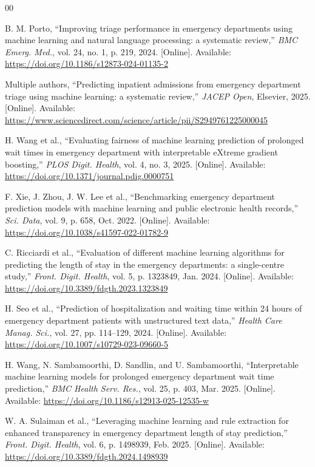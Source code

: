 \documentclass[conference]{IEEEtran}
\begin{document}
\begin{thebibliography}{00}

B. M. Porto, ``Improving triage performance in emergency departments using
machine learning and natural language processing: a systematic review,''
\textit{BMC Emerg. Med.}, vol. 24, no. 1, p. 219, 2024. [Online]. Available:
\url{https://doi.org/10.1186/s12873-024-01135-2}

Multiple authors, ``Predicting inpatient admissions from emergency department
triage using machine learning: a systematic review,'' \textit{JACEP Open},
Elsevier, 2025. [Online]. Available:
\url{https://www.sciencedirect.com/science/article/pii/S2949761225000045}

H. Wang et al., ``Evaluating fairness of machine learning prediction of
prolonged wait times in emergency department with interpretable eXtreme
gradient boosting,'' \textit{PLOS Digit. Health}, vol. 4, no. 3, 2025.
[Online]. Available: \url{https://doi.org/10.1371/journal.pdig.0000751}

F. Xie, J. Zhou, J. W. Lee et al., ``Benchmarking emergency department
prediction models with machine learning and public electronic health
records,'' \textit{Sci. Data}, vol. 9, p. 658, Oct. 2022. [Online].
Available: \url{https://doi.org/10.1038/s41597-022-01782-9}

C. Ricciardi et al., ``Evaluation of different machine learning algorithms
for predicting the length of stay in the emergency departments: a
single-centre study,'' \textit{Front. Digit. Health}, vol. 5, p. 1323849,
Jan. 2024. [Online]. Available:
\url{https://doi.org/10.3389/fdgth.2023.1323849}

H. Seo et al., ``Prediction of hospitalization and waiting time within 24
hours of emergency department patients with unstructured text data,''
\textit{Health Care Manag. Sci.}, vol. 27, pp. 114--129, 2024. [Online].
Available: \url{https://doi.org/10.1007/s10729-023-09660-5}

H. Wang, N. Sambamoorthi, D. Sandlin, and U. Sambamoorthi, ``Interpretable
machine learning models for prolonged emergency department wait time
prediction,'' \textit{BMC Health Serv. Res.}, vol. 25, p. 403, Mar. 2025.
[Online]. Available: \url{https://doi.org/10.1186/s12913-025-12535-w}

W. A. Sulaiman et al., ``Leveraging machine learning and rule extraction for
enhanced transparency in emergency department length of stay prediction,''
\textit{Front. Digit. Health}, vol. 6, p. 1498939, Feb. 2025. [Online].
Available: \url{https://doi.org/10.3389/fdgth.2024.1498939}


\end{thebibliography}
\end{document}
